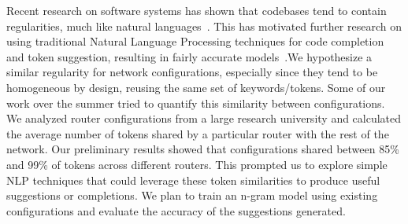 Recent research on software systems has shown that codebases tend to contain regularities, much like natural languages~\cite{naturalness}. This has motivated further research on using traditional Natural Language Processing techniques for code completion and token suggestion, resulting in fairly accurate models~\cite{naturalness, raychev}.We hypothesize a similar regularity for network configurations, especially since they tend to be homogeneous by design, reusing the same set of keywords/tokens. Some of our work over the summer tried to quantify this similarity between configurations. We analyzed router configurations from a large research university and calculated the average number of tokens shared by a particular router with the rest of the network. Our preliminary results showed that configurations shared between 85\% and 99\% of tokens across different routers. This prompted us to explore simple NLP techniques that could leverage these token similarities to produce useful suggestions or completions. We plan to train an n-gram model using existing configurations and evaluate the accuracy of the suggestions generated.